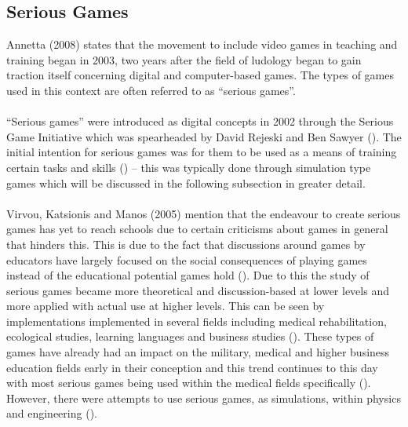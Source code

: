 \subsection{Serious Games}
Annetta (2008) states that the movement to include video games in teaching and training began in 2003, two years after the field of ludology began to gain traction itself concerning digital and computer-based games. The types of games used in this context are often referred to as “serious games”.  
\\\\
“Serious games” were introduced as digital concepts in 2002 through the Serious Game Initiative which was spearheaded by David Rejeski and Ben Sawyer (\cite{DeGloria2014}). The initial intention for serious games was for them to be used as a means of training certain tasks and skills (\cite{DeGloria2014}) – this was typically done through simulation type games which will be discussed in the following subsection in greater detail.
\\\\
Virvou, Katsionis and Manos (2005) mention that the endeavour to create serious games has yet to reach schools due to certain criticisms about games in general that hinders this. This is due to the fact that discussions around games by educators have largely focused on the social consequences of playing games instead of the educational potential games hold (\cite{Squire2003}). Due to this the study of serious games became more theoretical and discussion-based at lower levels and more applied with actual use at higher levels. This can be seen by implementations implemented in several fields including medical rehabilitation, ecological studies, learning languages and business studies (\cite{Burke2009, Costanza2014, Ranalli2008, Tao2009}). 
\newpage
These types of games have already had an impact on the military, medical and higher business education fields early in their conception and this trend continues to this day with most serious games being used within the medical fields specifically (\cite{Annetta2008, DeGloria2014}). However, there were attempts to use serious games, as simulations, within physics and engineering (\cite{Deshpande2011}).

